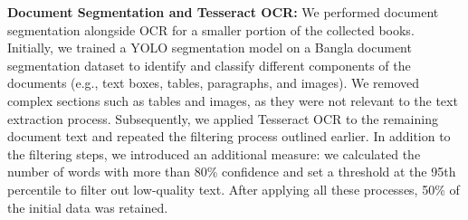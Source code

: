 \noindent \textbf{Document Segmentation and Tesseract OCR:} We performed document segmentation alongside OCR for a smaller portion of the collected books. Initially, we trained a YOLO segmentation model on a Bangla document segmentation dataset \cite{shihab2023badladlargemultidomainbengali} to identify and classify different components of the documents (e.g., text boxes, tables, paragraphs, and images). We removed complex sections such as tables and images, as they were not relevant to the text extraction process. Subsequently, we applied Tesseract OCR to the remaining document text and repeated the filtering process outlined earlier. In addition to the filtering steps, we introduced an additional measure: we calculated the number of words with more than 80\% confidence and set a threshold at the 95th percentile to filter out low-quality text. After applying all these processes, 50\% of the initial data was retained.    






